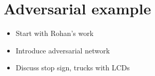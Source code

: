 \documentclass[14pt, twocolumn]{article}
\begin{document}
\section*{Adversarial example}
\begin{itemize}
	\item Start with Rohan's work 
	\item Introduce adversarial network 
	\item Discuss stop sign, trucks with LCDs 
\end{itemize}

\nocite{dumoulin2018guide}
\nocite{726791}
\nocite{43405}
\nocite{45818}
\nocite{10.5555/3086952}
\nocite{NIPS2014_5346}
 

\end{document}
